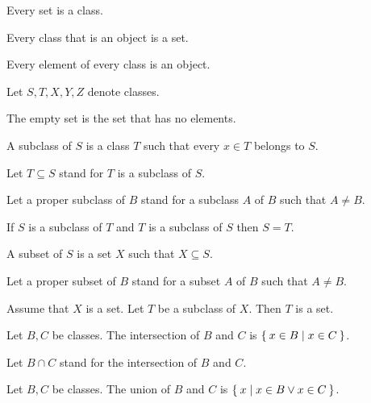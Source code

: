 \documentclass[11pt]{article}
\begin{document}
\begin{forthel}
  \begin{lemma}
    Every set is a class.
  \end{lemma}

  \begin{lemma}
    Every class that is an object is a set.
  \end{lemma}

  \begin{axiom}
    Every element of every class is an object.
  \end{axiom}

  Let $S, T, X, Y, Z$ denote classes.

  \begin{definition}
    The empty set is the set that has no elements.
  \end{definition}

  \begin{definition}
    A subclass of $S$ is a class $T$ such that every $x \in T$ belongs to $S$.
  \end{definition}

  Let $T \subseteq S$ stand for $T$ is a subclass of $S$.

  Let a proper subclass of $B$ stand for a subclass $A$ of $B$ such that $A \neq
  B$.

  \begin{lemma}
    If $S$ is a subclass of $T$ and $T$ is a subclass of $S$ then $S = T$.
  \end{lemma}

  \begin{definition}
    A subset of $S$ is a set $X$ such that $X \subseteq S$.
  \end{definition}

  Let a proper subset of $B$ stand for a subset $A$ of $B$ such that $A\neq B$.

  \begin{axiom}
    Assume that $X$ is a set.
    Let $T$ be a subclass of $X$.
    Then $T$ is a set.
  \end{axiom}

  \begin{definition}
    Let $B, C$ be classes.
    The intersection of $B$ and $C$ is $\Set{ x \in B | x \in C}$.
  \end{definition}

  Let $B \cap C$ stand for the intersection of $B$ and $C$.

  \begin{definition}
    Let $B, C$ be classes.
    The union of $B$ and $C$ is $\Set{ x | x \in B \vee x \in C}$.
  \end{definition}


\end{forthel}
\end{document}
